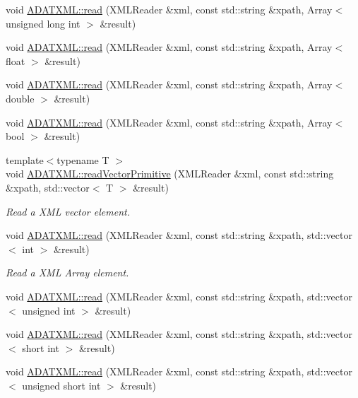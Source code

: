 \begin{DoxyCompactItemize}
\item 
void \mbox{\hyperlink{group__io_gae84bf39f198c8718403a15bc408a09a1}{A\+D\+A\+T\+X\+M\+L\+::read}} (X\+M\+L\+Reader \&xml, const std\+::string \&xpath, Array$<$ unsigned long int $>$ \&result)
\item 
void \mbox{\hyperlink{group__io_gab83c1ad39e65d00b48e6e4b0611c270f}{A\+D\+A\+T\+X\+M\+L\+::read}} (X\+M\+L\+Reader \&xml, const std\+::string \&xpath, Array$<$ float $>$ \&result)
\item 
void \mbox{\hyperlink{group__io_gade490f5b9db35aa7bc58c6bb07848048}{A\+D\+A\+T\+X\+M\+L\+::read}} (X\+M\+L\+Reader \&xml, const std\+::string \&xpath, Array$<$ double $>$ \&result)
\item 
void \mbox{\hyperlink{group__io_gaea910d2bb1864c350f979d14f6c1527f}{A\+D\+A\+T\+X\+M\+L\+::read}} (X\+M\+L\+Reader \&xml, const std\+::string \&xpath, Array$<$ bool $>$ \&result)
\item 
{\footnotesize template$<$typename T $>$ }\\void \mbox{\hyperlink{namespaceADATXML_a485bbc9069166009de61296df9dfe74b}{A\+D\+A\+T\+X\+M\+L\+::read\+Vector\+Primitive}} (X\+M\+L\+Reader \&xml, const std\+::string \&xpath, std\+::vector$<$ T $>$ \&result)
\begin{DoxyCompactList}\small\item\em Read a X\+ML vector element. \end{DoxyCompactList}\item 
void \mbox{\hyperlink{group__io_gaba3ec8cd866164ea8bdc810edeaf8210}{A\+D\+A\+T\+X\+M\+L\+::read}} (X\+M\+L\+Reader \&xml, const std\+::string \&xpath, std\+::vector$<$ int $>$ \&result)
\begin{DoxyCompactList}\small\item\em Read a X\+ML Array element. \end{DoxyCompactList}\item 
void \mbox{\hyperlink{group__io_ga745a0160808dcca1ec6805d77979bfcc}{A\+D\+A\+T\+X\+M\+L\+::read}} (X\+M\+L\+Reader \&xml, const std\+::string \&xpath, std\+::vector$<$ unsigned int $>$ \&result)
\item 
void \mbox{\hyperlink{group__io_ga5ca3f42dfcdc536156476e7f6d6db61c}{A\+D\+A\+T\+X\+M\+L\+::read}} (X\+M\+L\+Reader \&xml, const std\+::string \&xpath, std\+::vector$<$ short int $>$ \&result)
\item 
void \mbox{\hyperlink{group__io_gacd64b080900323aa538c91b95c83248d}{A\+D\+A\+T\+X\+M\+L\+::read}} (X\+M\+L\+Reader \&xml, const std\+::string \&xpath, std\+::vector$<$ unsigned short int $>$ \&result)

\end{DoxyCompactItemize}
